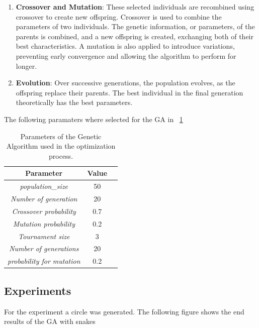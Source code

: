 \documentclass[10pt,twocolumn,letterpaper]{article}
\begin{document}
\begin{enumerate}
  \item \textbf{Crossover and Mutation}: These selected individuals are recombined using crossover to create new offspring. Crossover is used to combine the parameters of two individuals. The genetic information, or parameters, of the parents is combined, and a new offspring is created, exchanging both of their best characteristics. A mutation is also applied to introduce variations, preventing early convergence and allowing the algorithm to perform for longer.

\item \textbf{Evolution}: Over successive generations, the population evolves, as the offspring replace their parents. The best individual in the final generation theoretically has the best parameters.
\end{enumerate}
The following paramaters where selected for the GA in ~\ref{tab:ga_algorithm_params}
\begin{table}[h!]
\centering
\begin{tabular}{|c|c|c|}
\hline
\textbf{Parameter}                                   & \textbf{Value}      \\ \hline
\textit{population\_size}         & 50                 \\ \hline
\textit{Number of generation}           & 20                 \\ \hline
\textit{ Crossover probability}                 & 0.7                \\ \hline
\textit{Mutation probability   }                                         & 0.2                \\ \hline
\textit{ Tournament size}                           & 3                  \\ \hline
\textit{Number of generations}                                       & 20                 \\ \hline
\textit{probability for mutation}              & 0.2                \\ \hline
\end{tabular}
\caption{Parameters of the Genetic Algorithm used in the optimization process.}
\label{tab:ga_algorithm_params}
\end{table}
\subsection{Experiments}
For the experiment a circle was generated. The following figure shows the end results of the GA with snakes
\end{document}

